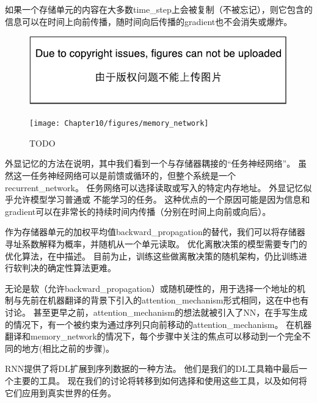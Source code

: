 如果一个存储单元的内容在大多数\gls{time_step}上会被复制（不被忘记），则它包含的信息可以在时间上向前传播，随时间向后传播的\gls{gradient}也不会消失或爆炸。

\begin{figure}[!htb]
\ifOpenSource
\centerline{\includegraphics{figure.pdf}}
\else
\centerline{\texttt{[image: Chapter10/figures/memory\_network]}}
\fi
\caption{TODO}
\label{fig:chap10_memory_network}
\end{figure}

外显记忆的方法在说明，其中我们看到一个与存储器耦接的``任务神经网络''。
虽然这一任务神经网络可以是前馈或循环的，但整个系统是一个\gls{recurrent_network}。
任务网络可以选择读取或写入的特定内存地址。
外显记忆似乎允许模型学习普通或 不能学习的任务。
这种优点的一个原因可能是因为信息和\gls{gradient}可以在非常长的持续时间内传播（分别在时间上向前或向后）。


作为存储器单元的加权平均值\gls{backward_propagation}的替代，我们可以将存储器寻址系数解释为概率，并随机从一个单元读取\citep{Zaremba+Sutskever-arxiv2015}。
优化离散决策的模型需要专门的优化算法，在中描述。
目前为止，训练这些做离散决策的随机架构，仍比训练进行软判决的确定性算法更难。

无论是软（允许\gls{backward_propagation}）或随机硬性的，用于选择一个地址的机制与先前在机器翻译的背景下引入的\gls{attention_mechanism}形式相同\citep{Bahdanau-et-al-ICLR2015-small}，这在中也有讨论。
甚至更早之前，\gls{attention_mechanism}的想法就被引入了\gls{NN}，在手写生成的情况下\citep{Graves-arxiv2013}，有一个被约束为通过序列只向前移动的\gls{attention_mechanism}。
在机器翻译和\gls{memory_network}的情况下，每个步骤中关注的焦点可以移动到一个完全不同的地方(相比之前的步骤)。

\gls{RNN}提供了将\gls{DL}扩展到序列数据的一种方法。
他们是我们的\gls{DL}工具箱中最后一个主要的工具。
现在我们的讨论将转移到如何选择和使用这些工具，以及如何将它们应用到真实世界的任务。
